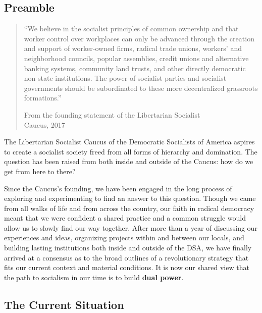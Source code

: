 \documentclass[10pt]{memoir}
\def \href #1#2{#2} %
\begin{document}
\subsection{Preamble}\label{preamble}

\begin{quote}
``We believe in the socialist principles of common ownership and that
worker control over workplaces can only be advanced through the creation
and support of worker-owned firms, radical trade unions, workers' and
neighborhood councils, popular assemblies, credit unions and alternative
banking systems, community land trusts, and other directly democratic
non-state institutions. The power of socialist parties and socialist
governments should be subordinated to these more decentralized
grassroots formations.''

From \href{https://dsa-lsc.org/}{the founding statement} of the
Libertarian Socialist\\ Caucus, 2017
\end{quote}

The Libertarian Socialist Caucus of the Democratic Socialists of America
aspires to create a socialist society freed from all forms of hierarchy
and domination. The question has been raised from both inside and
outside of the Caucus: how do we get from here to there?

Since the Caucus's founding, we have been engaged in the long process of
exploring and experimenting to find an answer to this question. Though
we came from all walks of life and from across the country, our faith in
radical democracy meant that we were confident a shared practice and a
common struggle would allow us to slowly find our way together. After
more than a year of discussing our experiences and ideas, organizing
projects within and between our locals, and building lasting
institutions both inside and outside of the DSA, we have finally arrived
at a consensus as to the broad outlines of a revolutionary strategy that
fits our current context and material conditions. It is now our shared
view that the path to socialism in our time is to build \textbf{dual
power}.

\subsection{The Current Situation}\label{the-current-situation}
\end{document}
